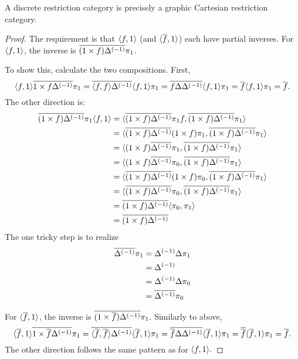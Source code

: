 \begin{lemma}\label{lem:a_discrete_crc_is_precisely_a_graphic_crc}
A discrete restriction category is precisely a
graphic Cartesian restriction category.
\end{lemma}
\begin{proof}
The requirement is that $\langle f,1\rangle$ (and $\langle\overline{f},1\rangle$) each have partial inverses. For
$\langle f,1\rangle$, the inverse is
$\overline{(1 \times f){\Delta}^{(-1)}} \pi_1$.

To show this, calculate  the two compositions. First,
\[
\<f,1\> \rst{1 \times f \inv{\Delta}} \pi_1 = \rst{\<f,f\> \inv{\Delta}}\<f,1\>\pi_1 %
= \rst{f \Delta \inv{\Delta}}\<f,1\>\pi_1 %
= \rst{f}\<f,1\>\pi_1 %
= \rst{f}.%
\]
The other direction is:
\begin{align*}
\rst{(1 \times f)\inv{\Delta}} \pi_1 \<f,1\>
  &= \< \rst{(1 \times f)\inv{\Delta}} \pi_1 f , \rst{(1 \times f)\inv{\Delta}}\pi_1 \>\\ %
  &= \< \rst{(1 \times f)\inv{\Delta}} (1 \times f) \pi_1, \rst{(1 \times f)\inv{\Delta}}\pi_1 \>\\ %
  &= \< (1 \times f )\rst{\inv{\Delta}} \pi_1 ,\rst{(1 \times f)\inv{\Delta}}\pi_1 \>\\ %
  &= \< (1 \times f) \rst{\inv{\Delta}} \pi_0 ,\rst{(1 \times f)\inv{\Delta}}\pi_1 \>\\ %
  &= \< \rst{(1 \times f)\inv{\Delta}} (1 \times f) \pi_0, \rst{(1 \times f)\inv{\Delta}}\pi_1 \>\\ %
  &= \< \rst{(1 \times f)\inv{\Delta}} \pi_0, \rst{(1 \times f)\inv{\Delta}}\pi_1 \>\\ %
  &= \rst{(1 \times f)\inv{\Delta}} \< \pi_0, \pi_1 \>\\ %
  &= \rst{(1 \times f)\inv{\Delta}}
\end{align*}
The one tricky step is to realize
\begin{align*}
     \overline{{\Delta}^{(-1)}} \pi_1
        &= {\Delta}^{(-1)} \Delta \pi_1\\
        &= {\Delta}^{(-1)}\\
        &= {\Delta}^{(-1)} \Delta \pi_0\\
        &= \overline{{\Delta}^{(-1)}} \pi_0
\end{align*}

For $\langle\overline{f},1\rangle$, the inverse is $\overline{(1 \times \overline{f}){\Delta}^{(-1)}} \pi_1$. Similarly to above,
\[
\<\rst{f},1\> \rst{1 \times \rst{f} \inv{\Delta}} \pi_1 = \rst{\<\rst{f},\rst{f}\> \inv{\Delta}}\<\rst{f},1\>\pi_1 %
= \rst{\rst{f} \Delta \inv{\Delta}}\<\rst{f},1\>\pi_1 %
= \rst{\rst{f}}\<\rst{f},1\>\pi_1 %
= \rst{f}.%
\]
The other direction follows the same pattern as for $\langle f,1\rangle.$
\end{proof}

